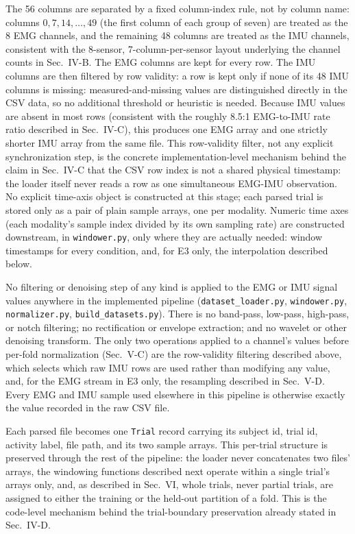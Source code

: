 \documentclass[conference]{IEEEtran}
\begin{document}
The 56 columns are separated by a fixed column-index rule, not by
column name: columns $0, 7, 14, \ldots, 49$ (the first column of
each group of seven) are treated as the 8 EMG channels, and the
remaining 48 columns are treated as the IMU channels, consistent
with the 8-sensor, 7-column-per-sensor layout underlying the
channel counts in Sec.~IV-B. The EMG columns are kept for every row.
The IMU columns are then filtered by row validity: a row is kept
only if none of its 48 IMU columns is missing: measured-and-missing
values are distinguished directly in the CSV data, so no additional
threshold or heuristic is needed. Because IMU values are absent in
most rows (consistent with the roughly 8.5:1 EMG-to-IMU rate ratio
described in Sec.~IV-C), this produces one EMG array and one
strictly shorter IMU array from the same file. This row-validity
filter, not any explicit synchronization step, is the concrete
implementation-level mechanism behind the claim in Sec.~IV-C that
the CSV row index is not a shared physical timestamp: the loader
itself never reads a row as one simultaneous EMG-IMU observation. No
explicit time-axis object is constructed at this stage; each parsed
trial is stored only as a pair of plain sample arrays, one per
modality. Numeric time axes (each modality's sample index divided by
its own sampling rate) are constructed downstream, in
\texttt{windower.py}, only where they are actually needed: window
timestamps for every condition, and, for E3 only, the interpolation
described below.

No filtering or denoising step of any kind is applied to the EMG or
IMU signal values anywhere in the implemented pipeline
(\texttt{dataset\_loader.py}, \texttt{windower.py},
\texttt{normalizer.py}, \texttt{build\_datasets.py}). There is no
band-pass, low-pass, high-pass, or notch filtering; no rectification
or envelope extraction; and no wavelet or other denoising transform.
The only two operations applied to a channel's values before
per-fold normalization (Sec.~V-C) are the row-validity filtering
described above, which selects which raw IMU rows are used rather
than modifying any value, and, for the EMG stream in E3 only, the
resampling described in Sec.~V-D. Every EMG and IMU sample used
elsewhere in this pipeline is otherwise exactly the value recorded
in the raw CSV file.

Each parsed file becomes one \texttt{Trial} record carrying its
subject id, trial id, activity label, file path, and its two sample
arrays. This per-trial structure is preserved through the rest of
the pipeline: the loader never concatenates two files' arrays, the
windowing functions described next operate within a single trial's
arrays only, and, as described in Sec.~VI, whole trials, never
partial trials, are assigned to either the training or the held-out
partition of a fold. This is the code-level mechanism behind the
trial-boundary preservation already stated in Sec.~IV-D.
\end{document}
